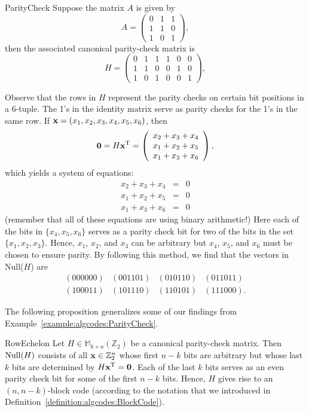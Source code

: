\begin{example}{ParityCheck}
Suppose the matrix $A$ is given by
\[
A =
\left(
\begin{array}{ccc}
0 & 1 & 1 \\
1 & 1 & 0 \\
1 & 0 & 1
\end{array}
\right),
\]
then the associated canonical parity-check matrix is
\[
H =
\left(
\begin{array}{cccccc}
0 & 1 & 1 & 1 & 0 & 0 \\
1 & 1 & 0 & 0 & 1 & 0 \\
1 & 0 & 1 & 0 & 0 & 1
\end{array}
\right),
\]

Observe that the rows in $H$  represent the parity checks on certain
bit positions in a 6-tuple. The 1's in the identity matrix serve as
parity checks for the 1's in the same row. If ${\bold x} = (x_1, x_2,
x_3, x_4, x_5, x_6)$, then 
\[
{\bold 0}
=
H{\bold x}^{\mathrm{T}}
=
\left(
\begin{array}{l}
x_2 + x_3 + x_4 \\
x_1 + x_2 + x_5\\
x_1 + x_3 + x_6
\end{array}
\right),
\]
which yields a system of equations:
\begin{eqnarray*}
x_2 + x_3 + x_4 & = & 0 \\
x_1 + x_2 + x_5 & = & 0 \\
x_1 + x_3 + x_6 & = & 0
\end{eqnarray*}
(remember that all of these equations are using binary arithmetic!) Here each of the bits in $\{x_4, x_5, x_6\}$ serves as a parity check bit for two of the bits in the set $\{x_1, x_2, x_3\}$.  Hence, $x_1$, $x_2$, and $x_3$ can be arbitrary but
$x_4$, $x_5$, and $x_6$ must be chosen to ensure parity. By following this method, we find that the vectors in Null($H$) are
\[
\begin{array}{cccc}
 (000000) & (001101) & (010110) & (011011) \\
 (100011) & (101110) & (110101) & (111000).
\end{array}
\]
\end{example}

The following proposition generalizes some of our findings from Example~\ref{example:algcodes:ParityCheck}.

\begin{prop}{RowEchelon}
Let $H \in \mathbb{M}_{k \times n}(\mathbb{Z}_2)$ be a canonical
parity-check matrix. Then ${\rm Null}(H)$ consists of all 
${\bold x} \in {\Bbb
Z}_2^n$ whose first $n-k$ bits are arbitrary but whose last $k$ bits
are determined by $H{\bold x}^{\mathrm{T}} = {\bold 0}$. Each of
the last $k$ bits serves as an even parity check bit for some of the
first $n-k$ bits. Hence, $H$ gives rise to an $(n, n-k)$-block code  (according to the notation that we introduced in Definition~\ref{definition:algcodes:BlockCode}). 
\end{prop}


